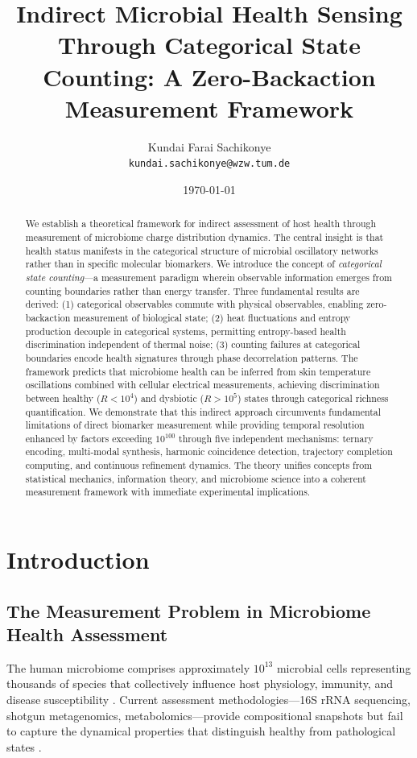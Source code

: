 \documentclass[twocolumn,10pt]{article}
\title{Indirect Microbial Health Sensing Through Categorical State Counting: A Zero-Backaction Measurement Framework}
\author{
    Kundai Farai Sachikonye\\
    \texttt{kundai.sachikonye@wzw.tum.de}
}
\date{\today}
\begin{document}
\maketitle

\begin{abstract}
We establish a theoretical framework for indirect assessment of host health through measurement of microbiome charge distribution dynamics. The central insight is that health status manifests in the categorical structure of microbial oscillatory networks rather than in specific molecular biomarkers. We introduce the concept of \textit{categorical state counting}---a measurement paradigm wherein observable information emerges from counting boundaries rather than energy transfer. Three fundamental results are derived: (1) categorical observables commute with physical observables, enabling zero-backaction measurement of biological state; (2) heat fluctuations and entropy production decouple in categorical systems, permitting entropy-based health discrimination independent of thermal noise; (3) counting failures at categorical boundaries encode health signatures through phase decorrelation patterns. The framework predicts that microbiome health can be inferred from skin temperature oscillations combined with cellular electrical measurements, achieving discrimination between healthy ($R < 10^4$) and dysbiotic ($R > 10^5$) states through categorical richness quantification. We demonstrate that this indirect approach circumvents fundamental limitations of direct biomarker measurement while providing temporal resolution enhanced by factors exceeding $10^{100}$ through five independent mechanisms: ternary encoding, multi-modal synthesis, harmonic coincidence detection, trajectory completion computing, and continuous refinement dynamics. The theory unifies concepts from statistical mechanics, information theory, and microbiome science into a coherent measurement framework with immediate experimental implications.
\end{abstract}

\section{Introduction}

\subsection{The Measurement Problem in Microbiome Health Assessment}

The human microbiome comprises approximately $10^{13}$ microbial cells representing thousands of species that collectively influence host physiology, immunity, and disease susceptibility \cite{sender2016,gilbert2018}. Current assessment methodologies---16S rRNA sequencing, shotgun metagenomics, metabolomics---provide compositional snapshots but fail to capture the dynamical properties that distinguish healthy from pathological states \cite{lloyd-price2019,zmora2019}.
\end{document}
